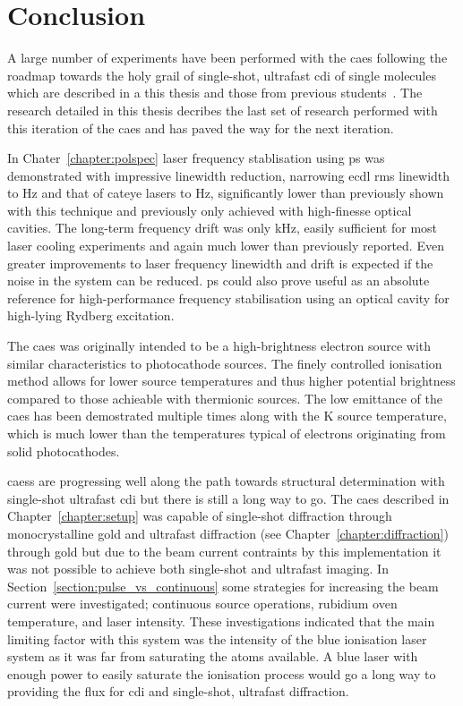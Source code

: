 \chapter{Conclusion}

A large number of experiments have been performed with the \gls{caes} following the roadmap towards the holy grail of single-shot, ultrafast \gls{cdi} of single molecules which are described in a this thesis and those from previous students~\cite{sheludko_shaped_2010,bell_cold_2011,saliba_cold_2011,mcculloch_generation_2013,taylor_rydberg_2013,tielen_development_2015,murphy_measurement_2017,speirs_electron_2017}.
The research detailed in this thesis decribes the last set of research performed with this iteration of the \gls{caes} and has paved the way for the next iteration.

In Chater~\ref{chapter:polspec} laser frequency stablisation using \gls{ps} was demonstrated with impressive linewidth reduction, narrowing \gls{ecdl} \gls{rms} linewidth to \unit[600]{Hz} and that of cateye lasers to \unit[360]{Hz}, significantly lower than previously shown with this technique and previously only achieved with high-finesse optical cavities.
The long-term frequency drift was only \unit[51]{kHz}, easily sufficient for most laser cooling experiments and again much lower than previously reported.
Even greater improvements to laser frequency linewidth and drift is expected if the noise in the system can be reduced.
\Gls{ps} could also prove useful as an absolute reference for high-performance frequency stabilisation using an optical cavity for high-lying Rydberg excitation.

The \gls{caes} was originally intended to be a high-brightness electron source with similar characteristics to photocathode sources.
The finely controlled ionisation method allows for lower source temperatures and thus higher potential brightness compared to those achieable with thermionic sources.
The low emittance of the \gls{caes} has been demostrated multiple times along with the \unit[10]{K} source temperature, which is much lower than the temperatures typical of electrons originating from solid photocathodes.

\Glspl{caes} are progressing well along the path towards structural determination with single-shot ultrafast \gls{cdi} but there is still a long way to go.
The \gls{caes} described in Chapter~\ref{chapter:setup} was capable of single-shot diffraction through monocrystalline gold and ultrafast diffraction (see Chapter~\ref{chapter:diffraction}) through gold but due to the beam current contraints by this implementation it was not possible to achieve both single-shot and ultrafast imaging.
In Section~\ref{section:pulse_vs_continuous} some strategies for increasing the beam current were investigated; continuous source operations, rubidium oven temperature, and laser intensity.
These investigations indicated that the main limiting factor with this system was the intensity of the blue ionisation laser system as it was far from saturating the atoms available.
A blue laser with enough power to easily saturate the ionisation process would go a long way to providing the flux for \gls{cdi} and single-shot, ultrafast diffraction.


